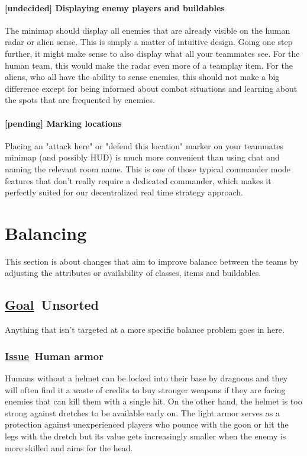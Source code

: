 \documentclass{scrartcl}
\newcommand{\goal}     [0]{\textbf{\underline{Goal}\ }}
\newcommand{\issue}    [0]{\textbf{\underline{Issue}\ }}
\newcommand{\undecided}[0]{\textcolor{undecided}{\textbf{[undecided] }}}
\newcommand{\pending}  [0]{\textcolor{pending}  {\textbf{[pending] }}}
\begin{document}
\paragraph{\undecided Displaying enemy players and buildables}

The minimap should display all enemies that are already visible on the human radar or alien sense. This is simply a matter of intuitive design. Going one step further, it might make sense to also display what all your teammates see. For the human team, this would make the radar even more of a teamplay item. For the aliens, who all have the ability to sense enemies, this should not make a big difference except for being informed about combat situations and learning about the spots that are frequented by enemies.

\paragraph{\pending Marking locations}

Placing an "attack here" or "defend this location" marker on your teammates minimap (and possibly HUD) is much more convenient than using chat and naming the relevant room name. This is one of those typical commander mode features that don't really require a dedicated commander, which makes it perfectly suited for our decentralized real time strategy approach.

\section{Balancing}

This section is about changes that aim to improve balance between the teams by adjusting the attributes or availability of classes, items and buildables.

\subsection{\goal Unsorted}

Anything that isn't targeted at a more specific balance problem goes in here.

\subsubsection{\issue Human armor}

Humans without a helmet can be locked into their base by dragoons and they will often find it a waste of credits to buy stronger weapons if they are facing enemies that can kill them with a single hit. On the other hand, the helmet is too strong against dretches to be available early on. The light armor serves as a protection against unexperienced players who pounce with the goon or hit the legs with the dretch but its value gets increasingly smaller when the enemy is more skilled and aims for the head.
\end{document}
